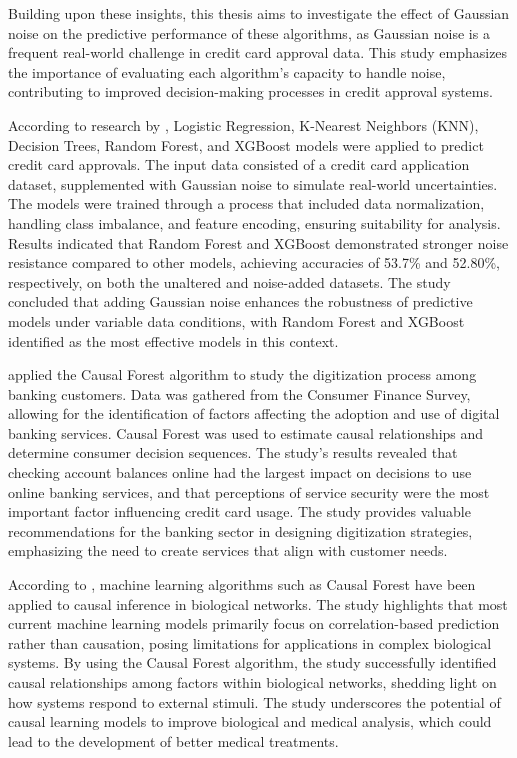 \documentclass[12pt]{report}
\begin{document}
    Building upon these insights, this thesis aims to investigate the effect of Gaussian noise on the predictive performance of these algorithms, as Gaussian noise is a frequent real-world challenge in credit card approval data. This study emphasizes the importance of evaluating each algorithm's capacity to handle noise, contributing to improved decision-making processes in credit approval systems.
    
    According to research by , Logistic Regression, K-Nearest Neighbors (KNN), Decision Trees, Random Forest, and XGBoost models were applied to predict credit card approvals. The input data consisted of a credit card application dataset, supplemented with Gaussian noise to simulate real-world uncertainties. The models were trained through a process that included data normalization, handling class imbalance, and feature encoding, ensuring suitability for analysis. Results indicated that Random Forest and XGBoost demonstrated stronger noise resistance compared to other models, achieving accuracies of 53.7\% and 52.80\%, respectively, on both the unaltered and noise-added datasets. The study concluded that adding Gaussian noise enhances the robustness of predictive models under variable data conditions, with Random Forest and XGBoost identified as the most effective models in this context.

     applied the Causal Forest algorithm to study the digitization process among banking customers. Data was gathered from the Consumer Finance Survey, allowing for the identification of factors affecting the adoption and use of digital banking services. Causal Forest was used to estimate causal relationships and determine consumer decision sequences. The study's results revealed that checking account balances online had the largest impact on decisions to use online banking services, and that perceptions of service security were the most important factor influencing credit card usage. The study provides valuable recommendations for the banking sector in designing digitization strategies, emphasizing the need to create services that align with customer needs.

    According to , machine learning algorithms such as Causal Forest have been applied to causal inference in biological networks. The study highlights that most current machine learning models primarily focus on correlation-based prediction rather than causation, posing limitations for applications in complex biological systems. By using the Causal Forest algorithm, the study successfully identified causal relationships among factors within biological networks, shedding light on how systems respond to external stimuli. The study underscores the potential of causal learning models to improve biological and medical analysis, which could lead to the development of better medical treatments.
\end{document}
